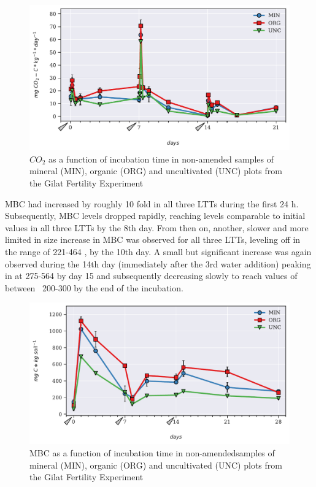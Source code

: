 			\begin{figure}[H]
				\centering
				\includegraphics[scale=0.8, width=\linewidth]{thesis_figures/main_incubation/control/Resp.pdf}
				\caption{$CO_2$  as a function of incubation time in non-amended samples of mineral (MIN), organic (ORG) and uncultivated (UNC) plots from the Gilat Fertility Experiment}
				\label{fig:resp_control_main}
			\end{figure}
			\noindent MBC had increased by roughly 10 fold in all three LTTs during the first 24 h. Subsequently, MBC levels dropped rapidly, reaching levels comparable to initial values in all three LTTs by the 8th day. From then on, another, slower and more limited in size increase in MBC was observed for all three LTTs, leveling off in the range of 221-464 \genericunit, by the 10th day. A small but significant increase was again observed during the 14th day (immediately after the 3rd water addition) peaking in at 275-564 \genericunit by day 15 and subsequently decreasing slowly to reach values of between ~200-300 \genericunit by the end of the incubation.\\
			\begin{figure}[H]
				\centering
				\includegraphics[scale=0.8, width=\linewidth]{thesis_figures/main_incubation/control/MBC.pdf}
				\caption{MBC  as a function of incubation time in non-amendedsamples of mineral (MIN), organic (ORG) and uncultivated (UNC) plots from the Gilat Fertility Experiment}
				\label{fig:mbc_control_main}
			\end{figure}

